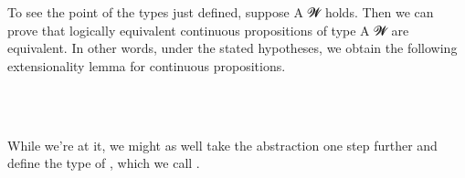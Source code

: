 \ccpad
To see the point of the types just defined, suppose  \ab A \ab 𝓦 holds. Then we can prove that logically equivalent continuous propositions of type  \ab A \ab 𝓦 are equivalent. In other words, under the stated hypotheses, we obtain the following  extensionality lemma for continuous propositions.
\ccpad
\begin{code}%
\>[0][@{}l@{\AgdaIndent{0}}]%
\>[1]\AgdaSpace{}%
\AgdaSymbol{:}\AgdaSpace{}%
\>[123I]\AgdaSymbol{\{}\AgdaSpace{}%
\AgdaSymbol{:}\AgdaSpace{}%
\AgdaSpace{}%
\AgdaSymbol{\}\{}\AgdaSpace{}%
\AgdaSymbol{:}\AgdaSpace{}%
\AgdaSymbol{\}}\AgdaSpace{}%
\AgdaSpace{}%
\AgdaSpace{}%
\AgdaSpace{}%
\<%
\\
\>[1][@{}l@{\AgdaIndent{0}}]%
\>[2]%
%
\>[15]\AgdaSymbol{\{}\AgdaSpace{}%
\AgdaSpace{}%
\AgdaSymbol{:}\AgdaSpace{}%
\AgdaSpace{}%
\AgdaSpace{}%
\AgdaSymbol{\}}\AgdaSpace{}%
\AgdaSpace{}%
\AgdaSpace{}%
\AgdaSpace{}%
\AgdaSpace{}%
\AgdaSpace{}%
\AgdaSpace{}%
\AgdaSpace{}%
\AgdaSpace{}%
\AgdaSpace{}%
\AgdaSpace{}%
\AgdaSpace{}%
\<%
\\
%
\>[1]\AgdaSpace{}%
\AgdaSpace{}%
\AgdaSpace{}%
\AgdaSymbol{=}\AgdaSpace{}%
%
\>[29]\AgdaSpace{}%
\AgdaSpace{}%
%
\>[38]\AgdaSpace{}%
\AgdaSpace{}%
\<%
\end{code}
\ccpad
While we're at it, we might as well take the abstraction one step further and define the type of , which we call .
\ccpad
